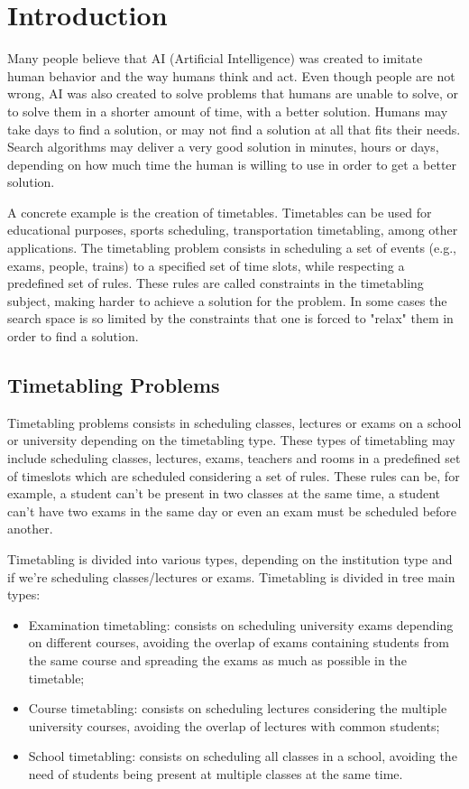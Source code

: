 \setcounter{secnumdepth}{3}
\chapter{Introduction}
\label{introduction}
\thispagestyle{plain}

Many people believe that AI (Artificial Intelligence) was created to imitate human behavior and the way humans think and act. Even though people are not wrong, AI was also created to solve problems that humans are unable to solve, or to solve them in a shorter amount of time, with a better solution. Humans may take days to find a solution, or may not find a solution at all that fits their needs. Search algorithms may deliver a very good solution in minutes, hours or days, depending on how much time the human is willing to use in order to get a better solution.

A concrete example is the creation of timetables. Timetables can be used for educational purposes, sports scheduling, transportation timetabling, among other applications. The timetabling problem consists in scheduling a set of events (e.g., exams, people, trains) to a specified set of time slots, while respecting a predefined set of rules. These rules are called constraints in the timetabling subject, making harder to achieve a solution for the problem. In some cases the search space is so limited by the constraints that one is forced to "relax" them in order to find a solution. 


\section{Timetabling Problems}

Timetabling problems consists in scheduling classes, lectures or exams on a school or university depending on the timetabling type. These types of timetabling may include scheduling classes, lectures, exams, teachers and rooms in a predefined set of timeslots which are scheduled considering a set of rules. These rules can be, for example, a student can't be present in two classes at the same time, a student can't have two exams in the same day or even an exam must be scheduled before another.

Timetabling is divided into various types, depending on the institution type and if we're scheduling classes/lectures or exams. Timetabling is divided in tree main types:

\begin{itemize}
	\item Examination timetabling: consists on scheduling university exams depending on different courses, avoiding the overlap of exams containing students from the same course and spreading the exams as much as possible in the timetable;
	\item Course timetabling: consists on scheduling lectures considering the multiple university courses, avoiding the overlap of lectures with common students;
	\item School timetabling: consists on scheduling all classes in a school, avoiding the need of students being present at multiple classes at the same time.
\end{itemize}

